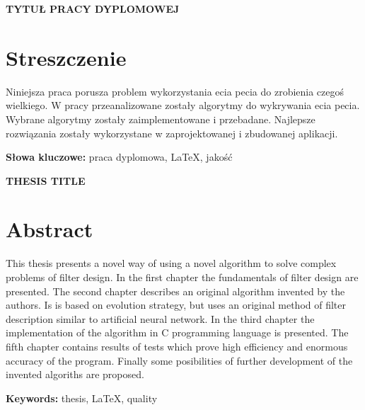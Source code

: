 \newpage
\begin{center}
\large \bf
TYTUŁ PRACY DYPLOMOWEJ
\end{center}

\section*{Streszczenie}
Niniejsza praca porusza problem wykorzystania ecia pecia do zrobienia czegoś wielkiego. W pracy przeanalizowane zostały algorytmy do wykrywania ecia pecia. Wybrane algorytmy zostały zaimplementowane i przebadane. Najlepsze rozwiązania zostały wykorzystane w zaprojektowanej i zbudowanej aplikacji.

\bigskip
{\noindent\bf Słowa kluczowe:} praca dyplomowa, LaTeX, jakość

\vskip 2cm

\newpage


\begin{center}
\large \bf
THESIS TITLE
\end{center}

\section*{Abstract}
This thesis presents a novel way of using a novel algorithm to solve complex
problems of filter design. In the first chapter the fundamentals of filter design
are presented. The second chapter describes an original algorithm invented by the
authors. Is is based on evolution strategy, but uses an original method of filter
description similar to artificial neural network. In the third chapter the implementation
of the algorithm in C programming language is presented. The fifth chapter contains results
of tests which prove high efficiency and enormous accuracy of the program. Finally some
posibilities of further development of the invented algoriths are proposed.

\bigskip
{\noindent\bf Keywords:} thesis, LaTeX, quality

\vfill